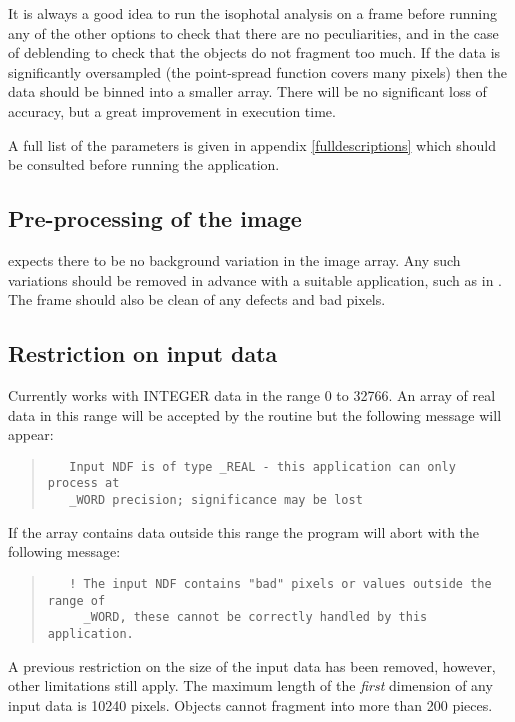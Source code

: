 It is always a good idea to run the isophotal analysis on a frame before
running any of the other options to check that there are no
peculiarities, and in the case of deblending to check that the objects
do not fragment too much. If the data is significantly oversampled (the
point-spread function covers many pixels) then the data should be binned
into a smaller array. There will be no significant loss of accuracy, but
a great improvement in execution time.

A full list of the  parameters is given in appendix
\ref{fulldescriptions} which should be consulted before running the
application.

\subsection{Pre-processing of the image}

 expects there to be no background variation in the
image array.  Any such variations should be removed in advance with a
suitable application, such as  in
. The frame should also be clean of any
defects and bad pixels.

\subsection{Restriction on input data}
Currently  works with INTEGER data in the range 0 to 32766. An
array of real data in this range will be accepted by the routine but the
following message will appear:
\begin{quote}
\begin{verbatim}
   Input NDF is of type _REAL - this application can only process at
   _WORD precision; significance may be lost
\end{verbatim}
\end{quote}
If the array contains data outside this range the program will abort
with the following message:
\begin{quote}
\begin{verbatim}
   ! The input NDF contains "bad" pixels or values outside the range of
     _WORD, these cannot be correctly handled by this application.
\end{verbatim}
\end{quote}

A previous restriction on the size of the input data has been removed,
however, other limitations still apply. The maximum length of the {\em
first} dimension of any input data is 10240 pixels. Objects cannot
fragment into more than 200 pieces.

